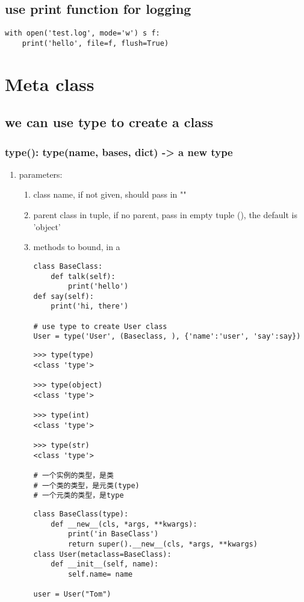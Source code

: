 \documentclass[11pt]{article}
\begin{document}
\subsection{use print function for logging}
\label{sec:orgf3710da}
\begin{verbatim}
with open('test.log', mode='w') s f:
    print('hello', file=f, flush=True)
\end{verbatim}


\section{Meta class}
\label{sec:org2d8cd13}

\subsection{we can use type to create a class}
\label{sec:orgac6f012}
\subsubsection{type(): type(name, bases, dict) -> a new type}
\label{sec:org768d2f9}
\begin{enumerate}
\item parameters:
\label{sec:org88f8846}
\begin{enumerate}
\item class name, if not given, should pass in ""
\label{sec:orgb6d7147}
\item parent class in tuple, if no parent, pass in empty tuple (), the default is 'object'
\label{sec:orgc4431e6}
\item methods to bound, in a
\label{sec:org566e472}
\begin{verbatim}
class BaseClass:
    def talk(self):
        print('hello')
def say(self):
    print('hi, there')

# use type to create User class
User = type('User', (Baseclass, ), {'name':'user', 'say':say})
\end{verbatim}
\begin{verbatim}
>>> type(type)
<class 'type'>

>>> type(object)
<class 'type'>

>>> type(int)
<class 'type'>

>>> type(str)
<class 'type'>

# 一个实例的类型，是类
# 一个类的类型，是元类(type)
# 一个元类的类型，是type
\end{verbatim}

\begin{verbatim}
class BaseClass(type):
    def __new__(cls, *args, **kwargs):
        print('in BaseClass')
        return super().__new__(cls, *args, **kwargs)
class User(metaclass=BaseClass):
    def __init__(self, name):
        self.name= name

user = User("Tom")        
\end{verbatim}
\end{enumerate}
\end{enumerate}
\end{document}
